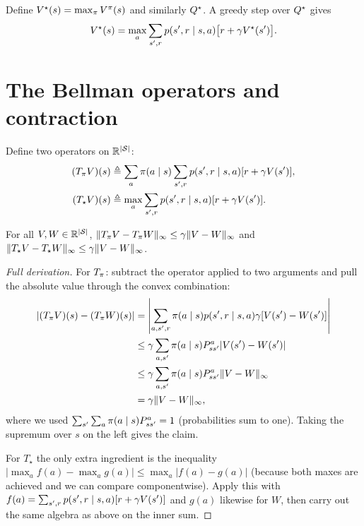 \documentclass[11pt,oneside]{scrbook}
\begin{document}
Define $V^\star(s) = \max_\pi V^\pi(s)$ and similarly $Q^\star$.
A greedy step over $Q^\star$ gives
\begin{equation}
V^\star(s) = \max_a \sum_{s', r} p(s', r\mid s, a)\big[r + \gamma V^\star(s')\big].
\label{eq:V-bellman-opt}
\end{equation}

\section{The Bellman operators and contraction}

Define two operators on $\mathbb{R}^{|\mathcal{S}|}$:
\begin{align}
(T_\pi V)(s) &\triangleq \sum_a \pi(a\mid s)\sum_{s',r} p(s',r\mid s,a)[r + \gamma V(s')],\\
(T_\star V)(s)   &\triangleq \max_a \sum_{s',r} p(s',r\mid s,a)[r + \gamma V(s')].
\end{align}

\begin{theorem}
\label{thm:contraction}
For all $V,W\in\mathbb{R}^{|\mathcal{S}|}$,
$\|T_\pi V - T_\pi W\|_\infty \le \gamma \|V - W\|_\infty$
and $\|T_\star V - T_\star W\|_\infty \le \gamma \|V - W\|_\infty$.
\end{theorem}

\begin{proof}[Full derivation]
For $T_\pi$: subtract the operator applied to two arguments and pull
the absolute value through the convex combination:
\begin{align*}
|(T_\pi V)(s) - (T_\pi W)(s)|
   &= \left|\sum_{a,s',r}\pi(a\mid s)p(s',r\mid s,a)\gamma[V(s') - W(s')]\right|\\
   &\le \gamma \sum_{a,s'}\pi(a\mid s)P^a_{ss'}|V(s') - W(s')|\\
   &\le \gamma \sum_{a,s'}\pi(a\mid s)P^a_{ss'}\|V - W\|_\infty\\
   &= \gamma \|V - W\|_\infty,
\end{align*}
where we used $\sum_{s'}\sum_a \pi(a\mid s)P^a_{ss'} = 1$ (probabilities
sum to one). Taking the supremum over $s$ on the left gives the claim.

For $T_\star$ the only extra ingredient is the inequality
$|\max_a f(a) - \max_a g(a)| \le \max_a |f(a) - g(a)|$ (because both maxes are
achieved and we can compare componentwise). Apply this with
$f(a) = \sum_{s',r}p(s',r\mid s,a)[r + \gamma V(s')]$ and $g(a)$ likewise for $W$,
then carry out the same algebra as above on the inner sum. \qedhere
\end{proof}
\end{document}
